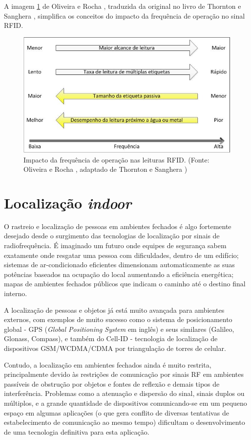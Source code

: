 A imagem \ref{fig:impactoFrec} de Oliveira e Rocha \cite{TG2013OliveiraERocha}, traduzida da original no livro de Thornton e Sanghera \cite{thornton2011cheat}, simplifica os conceitos do impacto da frequência de operação no sinal RFID.

\begin{figure}[H]
    \centering
    \includegraphics[width=0.8\linewidth]{figs/Fundamentos/frequencia.png}
    \caption{Impacto da frequência de operação nas leituras RFID. (Fonte: Oliveira e Rocha \cite{TG2013OliveiraERocha}, adaptado de Thornton e Sanghera \cite{thornton2011cheat})}
    \label{fig:impactoFrec}
\end{figure}
    
    
\section{Localização \textit{indoor}}

O rastreio e localização de pessoas em ambientes fechados é algo fortemente desejado desde o surgimento das tecnologias de localização por sinais de radiofrequência. É imaginado um futuro onde equipes de segurança sabem exatamente onde resgatar uma pessoa com dificuldades, dentro de um edifício; sistemas de ar-condicionado eficientes dimensionam automaticamente as suas potências baseados na ocupação do local aumentando a eficiência energética; mapas de ambientes fechados públicos que indicam o caminho até o destino final interno.

A localização de pessoas e objetos já está muito avançada para ambientes externos, com exemplos de muito sucesso como o sistema de posicionamento global - GPS (\textit{Global Positioning System} em inglês) e seus similares (Galileo, Glonass, Compass), e também do Cell-ID - tecnologia de localização de dispositivos GSM/WCDMA/CDMA por triangulação de torres de celular.

Contudo, a localização em ambientes fechados ainda é muito restrita, principalmente devido às restrições de comunicação por sinais RF em ambientes passíveis de obstrução por objetos e fontes de reflexão e demais tipos de interferência. Problemas como a atenuação e dispersão do sinal, sinais duplos ou múltiplos, e a grande quantidade de dispositivos comunicando-se em um pequeno espaço em algumas aplicações (o que gera conflito de diversas tentativas de estabelecimento de comunicação ao mesmo tempo) dificultam o desenvolvimento de uma tecnologia definitiva para esta aplicação.

